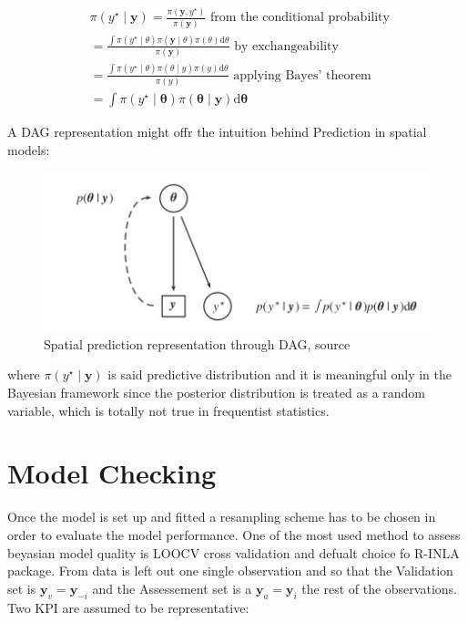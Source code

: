 \documentclass[
  12pt,
  a4paper,
  oneside]{book}
\theoremstyle{definition}
\theoremstyle{definition}
\theoremstyle{definition}
\theoremstyle{remark}
\begin{document}
\[
\begin{aligned}
&\pi\left(y^{\star} \mid \boldsymbol{y}\right)=\frac{\pi\left(\boldsymbol{y}, y^{\star}\right)}{\pi(\boldsymbol{y})} \text { from the conditional probability }\\
&=\frac{\int \pi\left(y^{\star} \mid \theta\right) \pi(\boldsymbol{y} \mid \theta) \pi(\theta) \mathrm{d} \theta}{\pi(\boldsymbol{y})} \text { by exchangeability }\\
&=\frac{\int \pi\left(y^{\star} \mid \theta\right) \pi(\theta \mid y) \pi(y) \mathrm{d} \theta}{\pi(y)} \text { applying Bayes' theorem }\\
&=\int \pi\left(y^{\star} \mid \boldsymbol{\theta}\right) \pi(\boldsymbol{\theta} \mid \boldsymbol{y}) \mathrm{d} \boldsymbol{\theta}
\end{aligned}
\]

A DAG representation might offr the intuition behind Prediction in spatial models:

\begin{figure}
\centering
\includegraphics{images/spatial_prediction.jpg}
\caption{Spatial prediction representation through DAG, source \citet{Blangiardo-Cameletti}}
\end{figure}

where \(\pi\left(y^{\star} \mid \boldsymbol{y}\right)\) is said predictive distribution and it is meaningful only in the Bayesian framework since the posterior distribution is treated as a random variable, which is totally not true in frequentist statistics.

\hypertarget{model-checking}{%
\section{Model Checking}\label{model-checking}}

Once the model is set up and fitted a resampling scheme has to be chosen in order to evaluate the model performance. One of the most used method to assess beyasian model quality is LOOCV cross validation and defualt choice fo R-INLA package. From data is left out one single observation and so that the Validation set is \(\boldsymbol{y}_{v} = \boldsymbol{y}_{-i}\) and the Assessement set is a \(\boldsymbol{y}_{a} = \boldsymbol{y}_{i}\)
the rest of the observations. Two KPI are assumed to be representative:
\end{document}
